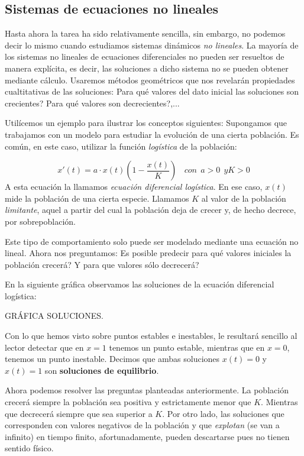 \subsection{Sistemas de ecuaciones no lineales}
Hasta ahora la tarea ha sido relativamente sencilla, sin embargo, no podemos decir lo mismo cuando estudiamos sistemas dinámicos \emph{no lineales}. La mayoría de los sistemas no lineales de ecuaciones diferenciales no pueden ser resueltos de manera explícita, es decir, las soluciones a dicho sistema no se pueden obtener mediante cálculo. Usaremos métodos geométricos que nos revelarán propiedades cualtitativas de las soluciones: Para qué valores del dato inicial las soluciones son crecientes? Para qué valores son decrecientes?,...

Utilícemos un ejemplo para ilustrar los conceptos siguientes: Supongamos que trabajamos con un modelo para estudiar la evolución de una cierta población. Es común, en este caso, utilizar la función \emph{logística} de la población:

\begin{equation}
x'(t) = a\cdot x(t)(1-\frac{x(t)}{K})~~~~con~~a>0~~yK>0
\end{equation}
A esta ecuación la llamamos \emph{ecuación diferencial logística}. En ese caso, $x(t)$ mide la población de una cierta especie. Llamamos $K$ al valor de la población \emph{limitante}, aquel a partir del cual la población deja de crecer y, de hecho decrece, por sobrepoblación.

Este tipo de comportamiento solo puede ser modelado mediante una ecuación no lineal. Ahora nos preguntamos: Es posible predecir para qué valores iniciales la población crecerá? Y para que valores sólo decrecerá?

En la siguiente gráfica observamos las soluciones de la ecuación diferencial logística:\newline

GRÁFICA SOLUCIONES.\newline

Con lo que hemos visto sobre puntos estables e inestables, le resultará sencillo al lector detectar que en $x=1$ tenemos un punto estable, mientras que en $x=0$, tenemos un punto inestable. Decimos que ambas soluciones $x(t) = 0$ y $x(t) = 1$ son \textbf{soluciones de equilibrio}.

Ahora podemos resolver las preguntas planteadas anteriormente. La población crecerá siempre la población sea positiva y estrictamente menor que $K$. Mientras que decrecerá siempre que sea superior a $K$. Por otro lado, las soluciones que corresponden con valores negativos de la población y que \emph{explotan} (se van a infinito) en tiempo finito, afortunadamente, pueden descartarse pues no tienen sentido físico.\newline


